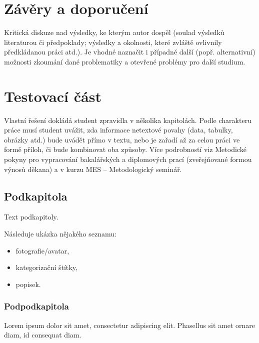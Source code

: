 \section{Závěry a doporučení}


Kritická diskuze nad výsledky, ke kterým autor dospěl (soulad výsledků  literaturou či předpoklady;
výsledky a okolnosti, které zvláště ovlivnily předkládanou práci atd.). Je vhodné naznačit i případné další
(popř. alternativní) možnosti zkoumání dané problematiky a otevřené problémy pro další studium.

\section{Testovací část}


Vlastní řešení dokládá student zpravidla v několika kapitolách. Podle charakteru práce musí student uvážit, zda informace
netextové povahy (data, tabulky, obrázky atd.) bude uvádět přímo v textu, nebo je zařadí až za celou práci ve formě příloh, či bude kombinovat oba způsoby.
Více podrobností viz Metodické pokyny pro vypracování bakalářských a diplomových prací (zveřejňované formou výnosů děkana)
a v kurzu MES – Metodologický seminář.

	\subsection{Podkapitola}

	Text podkapitoly.

	Následuje ukázka nějakého seznamu:
	\begin{itemize}
		\item fotografie/avatar,
		\item kategorizační štítky,
		\item popisek.
	\end{itemize}

		\subsubsection{Podpodkapitola}

		Lorem ipsum dolor sit amet, consectetur adipiscing elit. Phasellus sit amet ornare diam, id consequat diam.


